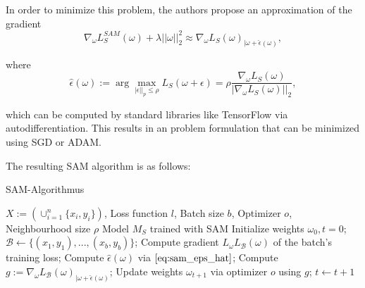 \documentclass[10pt,conference,compsocconf]{IEEEtran}
\begin{document}
In order to minimize this problem, the authors propose an approximation of the gradient 
\begin{equation} \label{eq:sam_approx}
\nabla_\omega L_S^{SAM}(\omega) + \lambda ||\omega||_2^2 \approx \nabla_\omega L_S(\omega)_{|\omega + \hat{\epsilon}(\omega)}, 
\end{equation}

where 
\begin{equation} \label{eq:sam_eps_hat}
\hat{\epsilon}(\omega) := \arg \max_{|\epsilon||_p \leq \rho} L_S(\omega + \epsilon) = \rho \frac{\nabla_\omega L_S(\omega)}{|\nabla_\omega L_S(\omega)||_2},
\end{equation}

 which can be computed by standard libraries like TensorFlow via autodifferentiation. This results in an problem formulation that can be minimized using SGD or ADAM. 

The resulting SAM algorithm is as follows: 

\begin{algorithm}
\caption{SAM-Algorithmus}\label{alg:sam}
\begin{algorithmic}
\Require $X := (\cup_{i = 1}^n\{x_i, y_i\})$, Loss function $l$, Batch size $b$, Optimizer $o$, Neighbourhood size $\rho$
\Ensure Model $M_S$ trained with SAM
\State Initialize weights $\omega_0, t = 0$;
	\State $\mathcal{B} \gets \{(x_1, y_1), ..., (x_b, y_b)\}$;	
	\State Compute gradient $L_\omega L_\mathcal{B}(\omega)$ of the batch's training loss; 
	\State Compute $\hat{\epsilon}(\omega)$ via $\eqref{eq:sam_eps_hat}$; 
	\State Compute $g := \nabla_\omega L_\mathcal{B}(\omega)_{|\omega + \hat{\epsilon}(\omega)}$; 
	\State Update weights $\omega_{t+1}$ via optimizer $o$ using $g$;
	\State $t \gets t+1$
\EndWhile
\end{algorithmic}
\end{algorithm}
\end{document}
